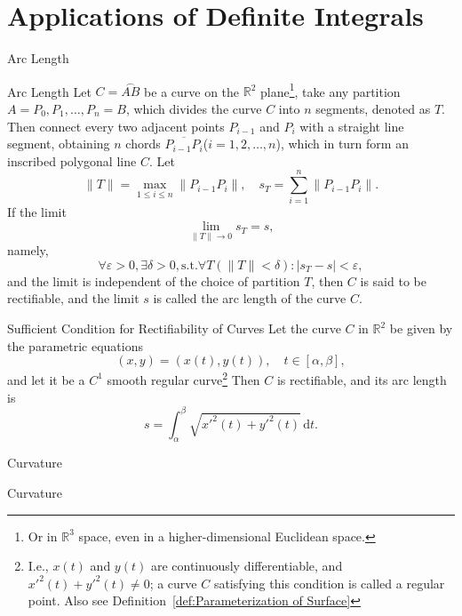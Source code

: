\documentclass[11pt]{../../TexTemplate/elegantbook}
\begin{document}
\section{Applications of Definite Integrals}
\begin{leftbarTitle}{Arc Length}\end{leftbarTitle}
\begin{definition}{Arc Length}
    Let \(C = \overset{\frown}{AB}\) be a curve on the \(\mathbb{R}^{2}\) plane\footnote{
        Or in \(\mathbb{R}^{3}\) space, even in a higher-dimensional Euclidean space.
    },
    take any partition \( A = P_{0}, P_{1}, \ldots, P_{n} = B \),
    which divides the curve \(C\) into \(n\) segments, denoted as \(T\).
    Then connect every two adjacent points \(P_{i-1}\) and \(P_{i}\) with a straight line segment,
    obtaining \(n\) chords \(\overline{P_{i-1}P_{i}}\)(\(i=1, 2, \ldots, n\)),
    which in turn form an inscribed polygonal line \(C\).
    Let 
    \[
    \|T\| = \max_{1 \leqslant i \leqslant n} \|P_{i-1}P_{i}\|, \quad s_{T}= \sum_{i=1}^{n} \|P_{i-1}P_{i}\|.
    \]
    If the limit
    \[
    \lim_{\|T\| \to 0} s_{T} = s,
    \] 
    namely, 
    \[
    \forall \varepsilon > 0, \exists \delta > 0, \text{s.t.} \forall T(\|T\| < \delta): |s_{T} - s| < \varepsilon,
    \]
    and the limit is independent of the choice of partition \(T\),
    then \(C\) is said to be rectifiable, and the limit \(s\) is called the arc length of the curve \(C\).
\end{definition}

\begin{theorem}{Sufficient Condition for Rectifiability of Curves}
    Let the curve \(C\) in \(\mathbb{R}^{2}\) be given by the parametric equations 
    \[
    (x, y) = (x(t), y(t)), \quad t \in [\alpha, \beta],
    \] 
    and let it be a \(C^{1}\) smooth regular curve\footnote{
        I.e., \(x(t)\) and \(y(t)\) are continuously differentiable, and \(x'^{2}(t) + y'^{2}(t) \neq 0\); 
        a curve \(C\) satisfying this condition is called a regular point.
        Also see Definition~\ref{def:Parameterization of Surface}
    }
    Then \(C\) is rectifiable, 
    and its arc length is 
    \[
    s = \int_{\alpha}^{\beta} \sqrt{x'^{2}(t) + y'^{2}(t)} \, \mathrm{d}t.
    \]
\end{theorem}

\begin{leftbarTitle}{Curvature}\end{leftbarTitle}
\begin{definition}{Curvature}
\end{definition}
\end{document}
